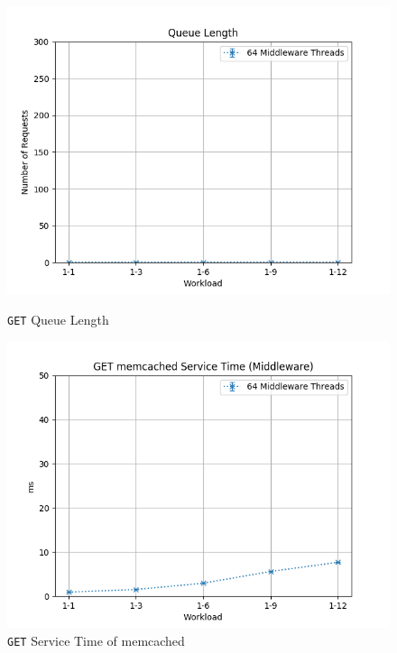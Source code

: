 \documentclass[11pt,a4paper]{article}
\begin{document}
%
\begin{figure}[H]
	\centering
	\captionsetup{width=0.4\textwidth}
    \begin{minipage}{0.5\textwidth}
        \includegraphics[width=\textwidth]{../illustrations/plots/4_1_full_system_read_sharded/64/middleware_queue_length.png}
        \caption{\texttt{GET} Queue Length}
        \label{fig:full_system_read_sharded_mw_ql}
    \end{minipage}\hfill
    \begin{minipage}{0.5\textwidth}
        \centering
        \includegraphics[width=\textwidth]{../illustrations/plots/4_1_full_system_read_sharded/64/middleware_get_service_time_ms.png}
        \caption{\texttt{GET} Service Time of memcached}
        \label{fig:full_system_read_sharded_mw_st}
    \end{minipage}
\end{figure}
\end{document}
